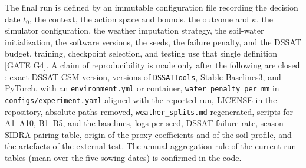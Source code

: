\documentclass[times,final,authoryear]{elsarticle}
\begin{document}
The final run is defined by an immutable configuration file recording the decision date $t_0$, the context, the action space and bounds, the outcome and $\kappa$, the simulator configuration, the weather imputation strategy, the soil-water initialization, the software versions, the seeds, the failure penalty, and the DSSAT budget, training, checkpoint selection, and testing use that single definition [GATE G4]. A claim of reproducibility is made only after the following are closed : exact DSSAT-CSM version, versions of \texttt{DSSATTools}, Stable-Baselines3, and PyTorch, with an \texttt{environment.yml} or container, \texttt{water\_penalty\_per\_mm} in \texttt{configs/experiment.yaml} aligned with the reported run, LICENSE in the repository, absolute paths removed, \texttt{weather\_splits.md} regenerated, scripts for A1--A10, B1--B5, and the baselines, logs per seed, DSSAT failure rate, season--SIDRA pairing table, origin of the proxy coefficients and of the soil profile, and the artefacts of the external test. The annual aggregation rule of the current-run tables (mean over the five sowing dates) is confirmed in the code.
\end{document}
